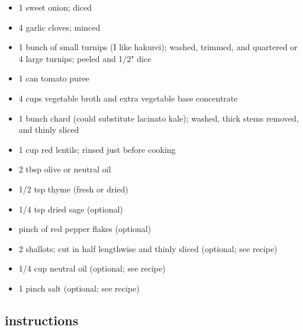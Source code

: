 \documentclass[]{book}
\providecommand{\tightlist}{%
  \setlength{\itemsep}{0pt}\setlength{\parskip}{0pt}}
\begin{document}
\begin{itemize}
\tightlist
\item
  1 sweet onion; diced
\item
  4 garlic cloves; minced
\item
  1 bunch of small turnips (I like hakurei); washed, trimmed, and quartered or 4 large turnips; peeled and 1/2" dice
\item
  1 can tomato puree
\item
  4 cups vegetable broth and extra vegetable base concentrate
\item
  1 bunch chard (could substitute lacinato kale); washed, thick stems removed, and thinly sliced
\item
  1 cup red lentils; rinsed just before cooking
\item
  2 tbsp olive or neutral oil
\item
  1/2 tsp thyme (fresh or dried)
\item
  1/4 tsp dried sage (optional)
\item
  pinch of red pepper flakes (optional)
\item
  2 shallots; cut in half lengthwise and thinly sliced (optional; see recipe)
\item
  1/4 cup neutral oil (optional; see recipe)
\item
  1 pinch salt (optional; see recipe)
\end{itemize}

\hypertarget{instructions-20}{%
\subsection{instructions}\label{instructions-20}}
\end{document}
